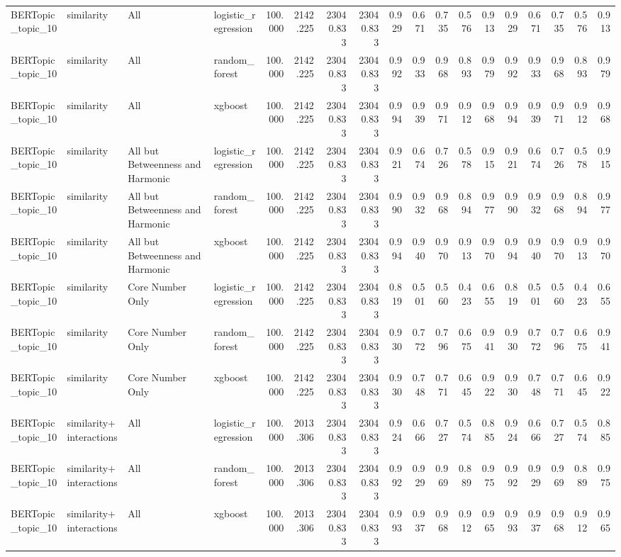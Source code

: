 \begin{tabular}{llllrrrrrrrrrrrrrr}
BERTopic_topic_10 & similarity & All & logistic_regression & 100.000 & 2142.225 & 23040.833 & 23040.833 & 0.929 & 0.671 & 0.735 & 0.576 & 0.913 & 0.929 & 0.671 & 0.735 & 0.576 & 0.913 \\
BERTopic_topic_10 & similarity & All & random_forest & 100.000 & 2142.225 & 23040.833 & 23040.833 & 0.992 & 0.933 & 0.968 & 0.893 & 0.979 & 0.992 & 0.933 & 0.968 & 0.893 & 0.979 \\
BERTopic_topic_10 & similarity & All & xgboost & 100.000 & 2142.225 & 23040.833 & 23040.833 & 0.994 & 0.939 & 0.971 & 0.912 & 0.968 & 0.994 & 0.939 & 0.971 & 0.912 & 0.968 \\
BERTopic_topic_10 & similarity & All but Betweenness and Harmonic & logistic_regression & 100.000 & 2142.225 & 23040.833 & 23040.833 & 0.921 & 0.674 & 0.726 & 0.578 & 0.915 & 0.921 & 0.674 & 0.726 & 0.578 & 0.915 \\
BERTopic_topic_10 & similarity & All but Betweenness and Harmonic & random_forest & 100.000 & 2142.225 & 23040.833 & 23040.833 & 0.990 & 0.932 & 0.968 & 0.894 & 0.977 & 0.990 & 0.932 & 0.968 & 0.894 & 0.977 \\
BERTopic_topic_10 & similarity & All but Betweenness and Harmonic & xgboost & 100.000 & 2142.225 & 23040.833 & 23040.833 & 0.994 & 0.940 & 0.970 & 0.913 & 0.970 & 0.994 & 0.940 & 0.970 & 0.913 & 0.970 \\
BERTopic_topic_10 & similarity & Core Number Only & logistic_regression & 100.000 & 2142.225 & 23040.833 & 23040.833 & 0.819 & 0.501 & 0.560 & 0.423 & 0.655 & 0.819 & 0.501 & 0.560 & 0.423 & 0.655 \\
BERTopic_topic_10 & similarity & Core Number Only & random_forest & 100.000 & 2142.225 & 23040.833 & 23040.833 & 0.930 & 0.772 & 0.796 & 0.675 & 0.941 & 0.930 & 0.772 & 0.796 & 0.675 & 0.941 \\
BERTopic_topic_10 & similarity & Core Number Only & xgboost & 100.000 & 2142.225 & 23040.833 & 23040.833 & 0.930 & 0.748 & 0.771 & 0.645 & 0.922 & 0.930 & 0.748 & 0.771 & 0.645 & 0.922 \\
BERTopic_topic_10 & similarity+interactions & All & logistic_regression & 100.000 & 2013.306 & 23040.833 & 23040.833 & 0.924 & 0.666 & 0.727 & 0.574 & 0.885 & 0.924 & 0.666 & 0.727 & 0.574 & 0.885 \\
BERTopic_topic_10 & similarity+interactions & All & random_forest & 100.000 & 2013.306 & 23040.833 & 23040.833 & 0.992 & 0.929 & 0.969 & 0.889 & 0.975 & 0.992 & 0.929 & 0.969 & 0.889 & 0.975 \\
BERTopic_topic_10 & similarity+interactions & All & xgboost & 100.000 & 2013.306 & 23040.833 & 23040.833 & 0.993 & 0.937 & 0.968 & 0.912 & 0.965 & 0.993 & 0.937 & 0.968 & 0.912 & 0.965 \\

\end{tabular}
